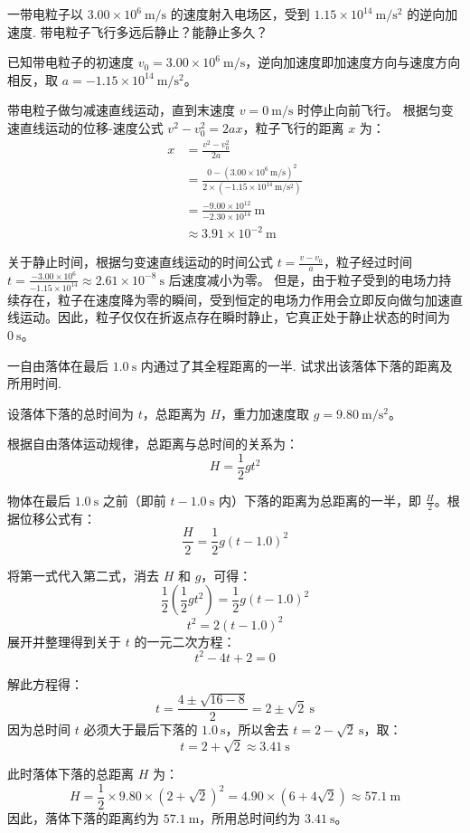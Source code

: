 \begin{exercise}\label{ex:2.1}
一带电粒子以 $3.00 \times 10^6 \ \mathrm{m/s}$ 的速度射入电场区，受到 $1.15 \times 10^{14} \ \mathrm{m/s^2}$ 的逆向加速度. 带电粒子飞行多远后静止？能静止多久？
\end{exercise}
\begin{solution}
已知带电粒子的初速度 $v_0 = 3.00 \times 10^6 \ \mathrm{m/s}$，逆向加速度即加速度方向与速度方向相反，取 $a = -1.15 \times 10^{14} \ \mathrm{m/s^2}$。

带电粒子做匀减速直线运动，直到末速度 $v = 0 \ \mathrm{m/s}$ 时停止向前飞行。
根据匀变速直线运动的位移-速度公式 $v^2 - v_0^2 = 2ax$，粒子飞行的距离 $x$ 为：
\[
\begin{aligned}
x &= \frac{v^2 - v_0^2}{2a}\\
  &= \frac{0 - (3.00 \times 10^6 \ \mathrm{m/s})^2}{2 \times (-1.15 \times 10^{14} \ \mathrm{m/s^2})}\\
  &= \frac{-9.00 \times 10^{12}}{-2.30 \times 10^{14}} \ \mathrm{m}\\
  &\approx 3.91 \times 10^{-2} \ \mathrm{m}
\end{aligned}
\]

关于静止时间，根据匀变速直线运动的时间公式 $t = \frac{v - v_0}{a}$，粒子经过时间 $t = \frac{-3.00 \times 10^6}{-1.15 \times 10^{14}} \approx 2.61 \times 10^{-8} \ \mathrm{s}$ 后速度减小为零。
但是，由于粒子受到的电场力持续存在，粒子在速度降为零的瞬间，受到恒定的电场力作用会立即反向做匀加速直线运动。因此，粒子仅仅在折返点存在瞬时静止，它真正处于静止状态的时间为 $0 \ \mathrm{s}$。
\end{solution}

\begin{exercise}\label{ex:2.2}
一自由落体在最后 $1.0 \ \mathrm{s}$ 内通过了其全程距离的一半. 试求出该落体下落的距离及所用时间.
\end{exercise}
\begin{solution}
设落体下落的总时间为 $t$，总距离为 $H$，重力加速度取 $g = 9.80 \ \mathrm{m/s^2}$。

根据自由落体运动规律，总距离与总时间的关系为：
$$ H = \frac{1}{2}gt^2 $$

物体在最后 $1.0 \ \mathrm{s}$ 之前（即前 $t - 1.0 \ \mathrm{s}$ 内）下落的距离为总距离的一半，即 $\frac{H}{2}$。根据位移公式有：
$$ \frac{H}{2} = \frac{1}{2}g(t - 1.0)^2 $$

将第一式代入第二式，消去 $H$ 和 $g$，可得：
$$ \frac{1}{2} \left( \frac{1}{2}gt^2 \right) = \frac{1}{2}g(t - 1.0)^2 $$
$$ t^2 = 2(t - 1.0)^2 $$
展开并整理得到关于 $t$ 的一元二次方程：
$$ t^2 - 4t + 2 = 0 $$

解此方程得：
$$ t = \frac{4 \pm \sqrt{16 - 8}}{2} = 2 \pm \sqrt{2} \ \mathrm{s} $$
因为总时间 $t$ 必须大于最后下落的 $1.0 \ \mathrm{s}$，所以舍去 $t = 2 - \sqrt{2} \ \mathrm{s}$，取：
$$ t = 2 + \sqrt{2} \approx 3.41 \ \mathrm{s} $$

此时落体下落的总距离 $H$ 为：
$$ H = \frac{1}{2} \times 9.80 \times (2 + \sqrt{2})^2 = 4.90 \times (6 + 4\sqrt{2}) \approx 57.1 \ \mathrm{m} $$
因此，落体下落的距离约为 $57.1 \ \mathrm{m}$，所用总时间约为 $3.41 \ \mathrm{s}$。
\end{solution}

